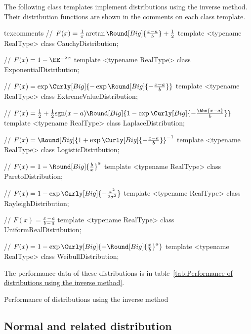 The following class templates implement distributions using the inverse method.
Their distribution functions are shown in the comments on each class template.
\begin{cppcode*}{texcomments}
  // $F(x) = \frac{1}{\pi}\arctan\Round[Big]{\frac{x - a}{b}} + \frac{1}{2}$
  template <typename RealType>
  class CauchyDistribution;

  // $F(x) = 1 - \EE^{-\lambda x}$
  template <typename RealType>
  class ExponentialDistribution;

  // $F(x) = \exp\Curly[Big]{-\exp\Round[Big]{-\frac{x - a}{b}}}$
  template <typename RealType>
  class ExtremeValueDistribution;

  // $F(x) = \frac{1}{2} + \frac{1}{2}\mathrm{sgn}(x - a)\Round[Big]{1 - \exp\Curly[Big]{-\frac{\Abs{x - a}}{b}}}$
  template <typename RealType>
  class LaplaceDistribution;

  // $F(x) = \Round[Big]{1 + \exp\Curly[Big]{-\frac{x - a}{b}}}^{-1}$
  template <typename RealType>
  class LogisticDistribution;

  // $F(x) = 1 - \Round[Big]{\frac{b}{x}}^a$
  template <typename RealType>
  class ParetoDistribution;

  // $F(x) = 1 - \exp\Curly[Big]{-\frac{x^2}{2\sigma^2}}$
  template <typename RealType>
  class RayleighDistribution;

  // $F(x) = \frac{x - a}{b - a}$
  template <typename RealType>
  class UniformRealDistribution;

  // $F(x) = 1 - \exp\Curly[Big]{-\Round[Big]{\frac{x}{b}}^a}$
  template <typename RealType>
  class WeibullDistribution;
\end{cppcode*}
The performance data of these distributions is in table~\ref{tab:Performance of
  distributions using the inverse method}.

\begin{table}
  
  \caption{Performance of distributions using the inverse method}
  \label{tab:Performance of distributions using the inverse method}
\end{table}

\subsection{Normal and related distribution}
\label{sub:Normal and related distribuiton}

